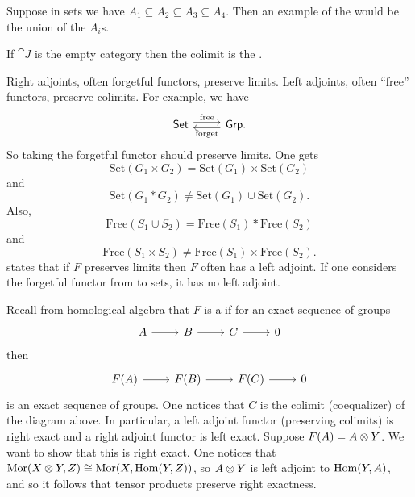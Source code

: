 \documentclass[11pt, oneside]{article}
\begin{document}
Suppose in sets we have $A_1 \subseteq A_2 \subseteq A_3 \subseteq A_4$. Then an example of the \href{https://en.wikipedia.org/wiki/Direct_limit}{} would be the union of the $A_i$s. 

If $\cat J$ is the empty category then the colimit is the \href{https://en.wikipedia.org/wiki/Initial_and_terminal_objects}{}.

Right adjoints, often forgetful functors, preserve limits. Left adjoints, often ``free'' functors, preserve colimits. For example, we have
\[
\begin{tikzcd}
\catn{Set} \arrow[r, shift left, "\mathrm{free}"]& \catn{Grp}. \arrow[l, shift left, "\mathrm{forget}"]
\end{tikzcd}
\]
So taking the forgetful functor should preserve limits. One gets
$$
\mathrm{Set}(G_1\times G_2) = \mathrm{Set}(G_1) \times \mathrm{Set}(G_2)
$$
and
$$
\mathrm{Set}(G_1* G_2) \neq \mathrm{Set}(G_1) \cup \mathrm{Set}(G_2).
$$
Also,
$$
\mathrm{Free}(S_1 \cup S_2) = \mathrm{Free}(S_1)*\mathrm{Free}(S_2)
$$
and
$$
\mathrm{Free}(S_1\times S_2) \neq \mathrm{Free}(S_1) \times \mathrm{Free}(S_2).
$$
\href{https://en.wikipedia.org/wiki/Formal_criteria_for_adjoint_functors}{} states that if $F$ preserves limits then $F$ often has a left adjoint. If one considers the forgetful functor from \href{https://en.wikipedia.org/wiki/Complete_Boolean_algebra}{} to sets, it has no left adjoint.

Recall from homological algebra that $F$ is a \href{https://en.wikipedia.org/wiki/Exact_functor}{} if for an exact sequence of groups
$$
\begin{tikzcd}
A \arrow[r] & B\arrow[r]& C\arrow[r] & 0
\end{tikzcd}
$$
then
$$
\begin{tikzcd}
F(A) \arrow[r] & F(B)\arrow[r]& F(C)\arrow[r] & 0
\end{tikzcd}
$$
is an exact sequence of groups. One notices that $C$ is the colimit (coequalizer) of the diagram above. In particular, a left adjoint functor (preserving colimits) is right exact and a right adjoint functor is left exact. Suppose $F(A) = A \otimes Y$. We want to show that this is right exact. One notices that $\operatorname{Mor}(X\otimes Y, Z) \cong \operatorname{Mor}(X, \operatorname{Hom}(Y, Z))$, so $A\otimes Y$ is left adjoint to $\operatorname{Hom} (Y,A)$, and so it follows that tensor products preserve right exactness. 
\end{document}
